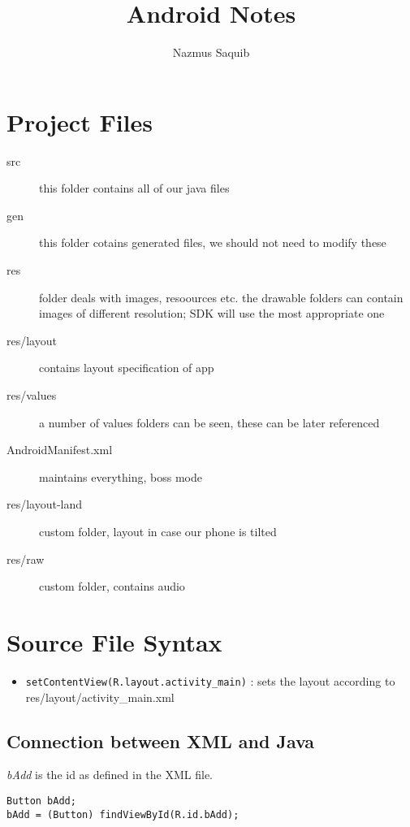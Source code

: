 \documentclass[a4paper, 12pt]{article}
\begin{document}
\title{Android Notes}
\author{Nazmus Saquib}

\maketitle
\tableofcontents

\section{Project Files}
\begin{description}
	\item[src] this folder contains all of our java files
	\item[gen] this folder cotains generated files, we should not need to modify these
	\item[res] folder deals with images, resoources etc. the drawable folders can contain images of different resolution; SDK will use the most appropriate one
	\item[res/layout] contains layout specification of app
	\item[res/values] a number of values folders can be seen, these can be later referenced
	\item[AndroidManifest.xml] maintains everything, boss mode
	\item[res/layout-land] custom folder, layout in case our phone is tilted
	\item[res/raw] custom folder, contains audio
\end{description}

\section{Source File Syntax}
\begin{itemize}
	\item \verb|setContentView(R.layout.activity_main)| : sets the layout according to res/layout/activity\_main.xml
\end{itemize}

\subsection{Connection between XML and Java}
\emph{bAdd} is the id as defined in the XML file.
\begin{verbatim}
Button bAdd;
bAdd = (Button) findViewById(R.id.bAdd);
\end{verbatim}
\end{document}

